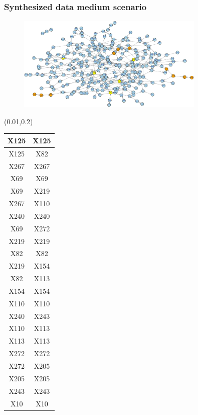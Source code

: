 \documentclass{beamer}
\newcommand{\boz}{\cellcolor{pathwaynode}}
\newcommand{\ghool}{\cellcolor{independentnode}}
\begin{document}
\begin{frame}[plain]
  \frametitle{Synthesized data medium scenario}
  \begin{figure}
    \includegraphics[width=0.8\textwidth]{synthesized-medium}
  \end{figure}
  \begin{textblock*}{\paperwidth}(0.01\textwidth,0.2\textheight)
    \raggedright 
    \tiny
    \begin{tabular}{| c c |}
      \hline
\boz X125   &  \boz X125  \\ \hline
\boz X125   &  \boz X82  \\ \hline
X267   &  X267  \\ \hline
X69   &  X69  \\ \hline
X69   &  \ghool X219  \\ \hline
X267   &  X110  \\ \hline
\boz X240   &  \boz X240  \\ \hline
X69   &  \boz X272  \\ \hline
\ghool X219   &  \ghool X219  \\ \hline
\boz X82   &  \boz X82  \\ \hline
\ghool X219   &  X154  \\ \hline
\boz X82   &  \boz X113  \\ \hline
X154   &  X154  \\ \hline
X110   &  X110  \\ \hline
\boz X240   &  \boz X243  \\ \hline
X110   &  \boz X113  \\ \hline
\boz X113   &  \boz X113  \\ \hline
\boz X272   &  \boz X272  \\ \hline
\boz X272   &  X205  \\ \hline
X205   &  X205  \\ \hline
\boz X243   &  \boz X243  \\ \hline
X10   &  X10  \\ \hline

\end{tabular}
\end{textblock*}
\end{frame}
\end{document}
